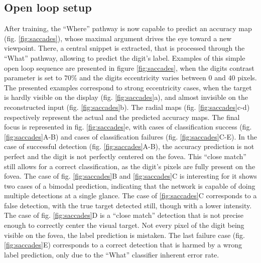 \subsection{Open loop setup}
After training, the ``Where'' pathway is now capable to predict an accuracy map (fig. \ref{fig:saccades}), whose maximal argument drives the eye toward a new viewpoint. There, a central snippet is extracted, that is processed through the ``What'' pathway, allowing to predict the digit's label. Examples of this simple open loop sequence are presented in figure \ref{fig:saccades}, when the digits contrast parameter is set to $70\%$ and the digits eccentricity varies between $0$ and $40$ pixels. The presented examples correspond to strong eccentricity cases, when the target is hardly visible on the display (fig. \ref{fig:saccades}a), and almost invisible on the reconstructed input (fig. \ref{fig:saccades}b). The radial maps (fig. \ref{fig:saccades}c-d) respectively represent the actual and the predicted accuracy maps. The final focus is represented in fig. \ref{fig:saccades}e, with cases of classification success (fig. \ref{fig:saccades}A-B) and cases of classification failures (fig. \ref{fig:saccades}C-E).
In the case of successful detection (fig. \ref{fig:saccades}A-B), the accuracy prediction is not perfect and the digit is not perfectly centered on the fovea. This ``close match'' still allows for a correct classification, as the digit's pixels are fully present on the fovea. The case of fig. \ref{fig:saccades}B and \ref{fig:saccades}C
 is interesting for it shows two cases of a bimodal prediction, indicating that the network is capable of doing multiple detections at a single glance. The case of \ref{fig:saccades}C corresponds to a false detection, with the true target detected still, though with a lower intensity. The case of fig. \ref{fig:saccades}D is a ``close match'' detection that is not precise enough to correctly center the visual target. Not every pixel of the digit being visible on the fovea, the label prediction is mistaken.
The last failure case (fig. \ref{fig:saccades}E) corresponds to a correct detection that is harmed by a wrong label prediction, only due to the ``What'' classifier inherent error rate.


